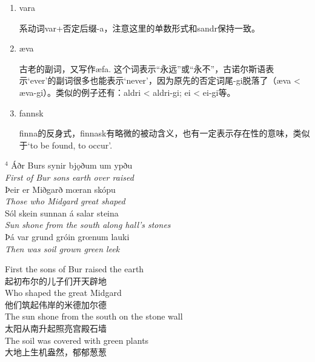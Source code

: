 \begin{grammar*}{}
    \begin{enumerate}[leftmargin=*]
        \item vara

              系动词var+否定后缀-a，注意这里的单数形式和sandr保持一致。

        \item æva

              古老的副词，又写作æfa. 这个词表示“永远”或“永不”，古诺尔斯语表示`ever'的副词很多也能表示`never'，因为原先的否定词尾-gi脱落了（æva < æva-gi）。类似的例子还有：aldri < aldri-gi; ei < ei-gi等。

        \item fannsk

              finna的反身式，finnask有略微的被动含义，也有一定表示存在性的意味，类似于`to be found, to occur'.

    \end{enumerate}
\end{grammar*}
\medskip %
\begin{paracol}{2}
    \noindent
    $^4 $ Áðr Burs synir bjǫðum um ypðu\\
    \textit{First of Bur sons earth over raised}\\
    Þeir er Miðgarð mœran skópu\\
    \textit{Those who Midgard great shaped}\\
    Sól skein sunnan á salar steina\\
    \textit{Sun shone from the south along hall's stones}\\
    Þá var grund gróin grœnum lauki\\
    \textit{Then was soil grown green leek}\\
    \switchcolumn

    \noindent
    First the sons of Bur raised the earth\\
    起初布尔的儿子们开天辟地\\
    Who shaped the great Midgard\\
    他们筑起伟岸的米德加尔德\\
    The sun shone from the south on the stone wall\\
    太阳从南升起照亮宫殿石墙\\
    The soil was covered with green plants\\
    大地上生机盎然，郁郁葱葱\\

\end{paracol}

